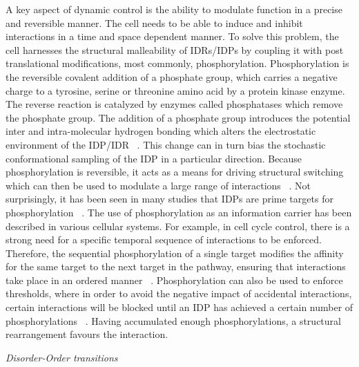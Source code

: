 A key aspect of dynamic control is the ability to modulate function in a precise and reversible manner.  The cell needs to be able to induce and inhibit interactions in a time and space dependent manner. To solve this problem, the cell harnesses the structural malleability of IDRs/IDPs by coupling it with post translational modifications, most commonly, phosphorylation. Phosphorylation is the reversible covalent addition of a phosphate  group,  which carries a negative  charge to a tyrosine, serine or threonine  amino acid by a protein kinase enzyme. The reverse reaction is catalyzed by enzymes called phosphatases which remove the phosphate group. The addition of a phosphate group introduces the potential inter and intra-molecular hydrogen bonding which alters the electrostatic environment of the IDP/IDR ~\cite{van1990effect}. This change can in turn bias the stochastic conformational sampling of the IDP in a particular direction. Because phosphorylation is reversible, it acts as a means for driving structural switching which can then be used to modulate a large range of interactions ~\cite{kern1999structure, ramelot2001phosphorylation, oxley2008integrin}. Not surprisingly, it has been seen in many studies that IDPs are prime targets for phosphorylation ~\cite{iakoucheva2004importance}.  The use of phosphorylation as an information carrier has been described in various cellular systems. For example, in cell cycle control, there is a strong need for a specific temporal sequence of interactions to be enforced. Therefore, the sequential phosphorylation of a single target modifies the affinity for the same target to the next target in the pathway, ensuring that interactions take place in an ordered manner ~\cite{wright2015intrinsically}. Phosphorylation can also be used to enforce thresholds, where in order to avoid the negative impact of accidental interactions, certain interactions will be blocked until an IDP has achieved a certain number of phosphorylations ~\cite{nash2001multisite}. Having accumulated enough phosphorylations, a structural rearrangement favours the interaction. 

{\it Disorder-Order transitions}


